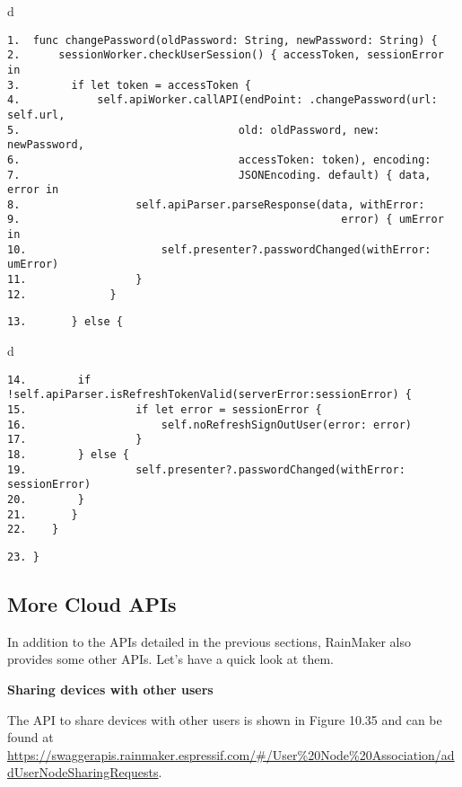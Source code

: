 \documentclass[a4paper,12pt]{book}
\begin{document}
\begin{codebloc}
\begin{tabular}{d}
\vspace{2pt}
\begin{verbatim}
1.  func changePassword(oldPassword: String, newPassword: String) {
2.      sessionWorker.checkUserSession() { accessToken, sessionError in
3.        if let token = accessToken {
4.            self.apiWorker.callAPI(endPoint: .changePassword(url: self.url,
5.                                  old: oldPassword, new: newPassword,
6.                                  accessToken: token), encoding:
7.                                  JSONEncoding. default) { data, error in
8.                  self.apiParser.parseResponse(data, withError:
9.                                                  error) { umError in
10.                     self.presenter?.passwordChanged(withError: umError)
11.                 }
12.             }
\end{verbatim}
\verb|13.       } else {|
\end{tabular}
\end{codebloc}

\begin{codebloc}
\begin{tabular}{d}
\vspace{2pt}
\begin{verbatim}
14.        if !self.apiParser.isRefreshTokenValid(serverError:sessionError) {
15.                 if let error = sessionError {
16.                     self.noRefreshSignOutUser(error: error)
17.                 }
18.        } else {
19.                 self.presenter?.passwordChanged(withError: sessionError)
20.        }
21.       }
22.    }
\end{verbatim}
\verb|23. }|
\end{tabular}
\end{codebloc}

\subsection{More Cloud APIs}
In addition to the APIs detailed in the previous sections, RainMaker also provides some other APIs. Let’s have a quick look at them.

\textbf{Sharing devices with other users}

The API to share devices with other users is shown in Figure 10.35 and can be found at \href{https://swaggerapis.rainmaker.espressif.com/#/User%20Node%20Association/addUserNodeSharingRequests}{https://swaggerapis.rainmaker.espressif.com/\#/User\%20Node\%20Association/addUser\newline NodeSharingRequests}.
\end{document}
